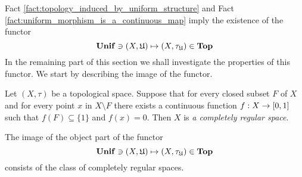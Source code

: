 \noindent
Fact \ref{fact:topology_induced_by_uniform_structure} and Fact \ref{fact:uniform_morphism_is_a_continuous_map} imply the existence of the functor 
$$\mathbf{Unif} \ni (X,{\mathfrak U}) \mapsto (X,\tau_{{\mathfrak U}})\in   \mathbf{Top}$$
In the remaining part of this section we shall investigate the properties of this functor. We start by describing the image of the functor.

\begin{definition}
Let $(X,\tau)$ be a topological space. Suppose that for every closed subset $F$ of $X$ and for every point $x$ in $X\setminus  F$ there exists a continuous function $f:X\rightarrow [0,1]$ such that $f(F) \subseteq \{1\}$ and $f(x) = 0$. Then $X$ is \textit{a completely regular space}. 
\end{definition}

\begin{theorem}\label{theorem:image_of_the_canonical_functor_is_completely_regular_space}
The image of the object part of the functor
$$\mathbf{Unif} \ni (X,{\mathfrak U}) \mapsto (X,\tau_{{\mathfrak U}}) \in \mathbf{Top}$$
consists of the class of completely regular spaces.
\end{theorem}
